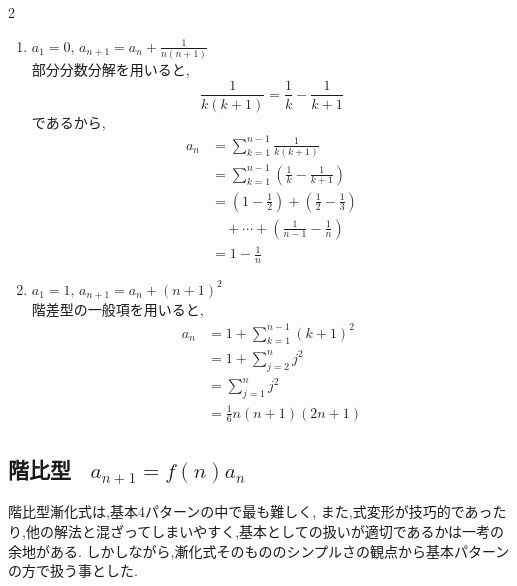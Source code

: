 \documentclass[dvipdfmx,a4paper,11pt,fleqn,openany]{jsbook}
\begin{document}
\begin{multicols*}{2}
\begin{enumerate}[label=(\arabic*),parsep=3pt]
        \item $\displaystyle a_1=0,\,a_{n+1}=a_n+\frac{1}{n(n+1)}$\\
              部分分数分解を用いると,
              \[
                \frac{1}{k(k+1)}
                =\frac{1}{k}-\frac{1}{k+1}
              \]
              であるから,
              \begin{align*}
                a_n
                  &=\sum_{k=1}^{n-1}\frac{1}{k(k+1)}\\
                  &=\sum_{k=1}^{n-1}
                    \left(\frac{1}{k}-\frac{1}{k+1}\right)\\
                  &=\left(1-\frac12\right)
                    +\left(\frac12-\frac13\right)\\
                  &\quad +\cdots+\left(\frac{1}{n-1}-\frac1n\right)\\
                  &=1-\frac1n
              \end{align*}

        \item $\displaystyle a_1=1,\,a_{n+1}=a_n+(n+1)^2$\\
              階差型の一般項を用いると,
              \begin{align*}
                a_n
                  &=1+\sum_{k=1}^{n-1}(k+1)^2\\
                  &=1+\sum_{j=2}^{n}j^2\\
                  &=\sum_{j=1}^{n}j^2\\
                  &=\frac{1}{6}n(n+1)(2n+1)
              \end{align*}
      \end{enumerate}
    \subsection{階比型 \, $a_{n+1}=f(n)a_n$}
      階比型漸化式は,基本4パターンの中で最も難しく,
      また,式変形が技巧的であったり,他の解法と混ざってしまいやすく,基本としての扱いが適切であるかは一考の余地がある.
      しかしながら,漸化式そのもののシンプルさの観点から基本パターンの方で扱う事とした.
      

\end{multicols*}
\end{document}
